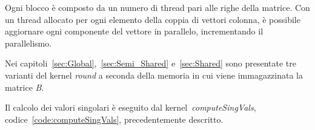 Ogni blocco è composto da un numero di thread pari alle righe della matrice. Con un thread allocato per ogni elemento della coppia di vettori colonna, è possibile aggiornare ogni componente del vettore in parallelo, incrementando il parallelismo.\cite{Romer:SVD}

Nei capitoli~\ref{sec:Global},~\ref{sec:Semi_Shared} e~\ref{sec:Shared} sono presentate tre varianti del kernel \textit{round} a seconda della memoria in cui viene immagazzinata la matrice \textit{B}.

Il calcolo dei valori singolari è eseguito dal kernel~\textit{computeSingVals}, codice~\ref{code:computeSingVals}, precedentemente descritto.